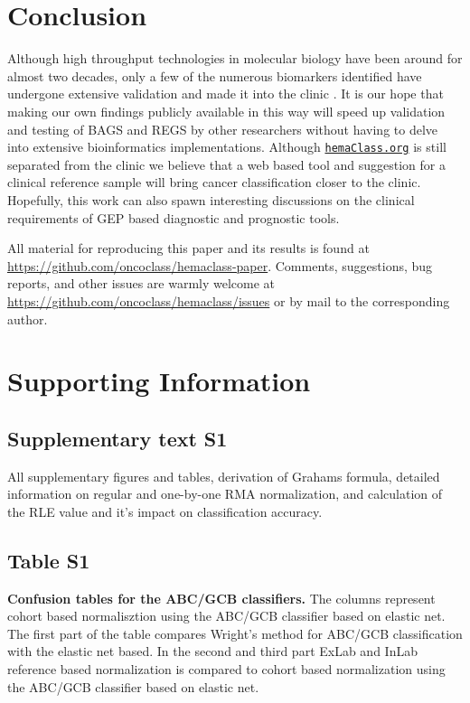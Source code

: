 \documentclass[10pt,letterpaper]{article}
\newcommand{\hemaClass}{\href{http://hemaClass.org}{\texttt{hemaClass.org}}}
\begin{document}
\section*{Conclusion}
Although high throughput technologies in molecular biology have been around for almost two decades, only a few of the numerous biomarkers identified have undergone extensive validation and made it into the clinic \cite{Chen2012a}.
It is our hope that making our own findings publicly available in this way will speed up validation and testing of BAGS and REGS by other researchers without having to delve into extensive bioinformatics implementations.
Although \hemaClass{} is still separated from the clinic we believe that a web based tool and suggestion for a clinical reference sample will bring cancer classification closer to the clinic.
Hopefully, this work can also spawn interesting discussions on the clinical requirements of GEP based diagnostic and prognostic tools.

All material for reproducing this paper and its results is found at \url{https://github.com/oncoclass/hemaclass-paper}.
Comments, suggestions, bug reports, and other issues are warmly welcome at \url{https://github.com/oncoclass/hemaclass/issues} or by mail to the corresponding author.

\section*{Supporting Information}

\setcounter{equation}{0}
\setcounter{figure}{0}
\setcounter{table}{0}

\renewcommand{\theequation}{S\arabic{equation}}
\renewcommand{\thefigure}{S\arabic{figure}}
\renewcommand{\thetable}{S\arabic{table}}
\renewcommand{\thesection}{S\arabic{section}}

\subsection*{Supplementary text S1}\label{supp:text}
All supplementary figures and tables, derivation of Grahams formula, detailed information on regular and one-by-one RMA normalization, and calculation of the RLE value and it's impact on classification accuracy. 

\subsection*{Table S1}\label{tab:confusionABCGCBHEMA}
\textbf{Confusion tables for the ABC/GCB classifiers.}
The columns represent cohort based normalisztion using the ABC/GCB classifier
based on elastic net.
The first part of the table compares Wright's method for ABC/GCB classification
with the elastic net based.
In the second and third part ExLab and InLab reference based normalization is
compared to cohort based normalization using the ABC/GCB classifier based on
elastic net.
\end{document}

